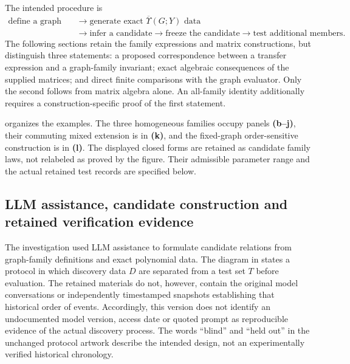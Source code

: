 \documentclass[10pt,twocolumn]{article}
\begin{document}
The intended procedure is
\begin{equation}
\boxed{\begin{aligned}
\text{define a graph family}&\longrightarrow\text{generate exact }\overline{\Upsilon}(G;Y)\text{ data}\\
&\longrightarrow\text{infer a candidate}\longrightarrow\text{freeze the candidate}\longrightarrow\text{test additional members}.
\end{aligned}}
\label{suppeq:yamada_discovery_direction}
\end{equation}
The following sections retain the family expressions and matrix constructions, but distinguish three statements: a proposed correspondence between a transfer expression and a graph-family invariant; exact algebraic consequences of the supplied matrices; and direct finite comparisons with the graph evaluator. Only the second follows from matrix algebra alone. An all-family identity additionally requires a construction-specific proof of the first statement.

 organizes the examples. The three homogeneous families occupy panels \textbf{(b--j)}, their commuting mixed extension is in \textbf{(k)}, and the fixed-graph order-sensitive construction is in \textbf{(l)}. The displayed closed forms are retained as candidate family laws, not relabeled as proved by the figure. Their admissible parameter range and the actual retained test records are specified below.

\subsection{LLM assistance, candidate construction and retained verification evidence}
\label{supp:llm_discovery_protocol}
The investigation used LLM assistance to formulate candidate relations from graph-family definitions and exact polynomial data. The diagram in  states a protocol in which discovery data $D$ are separated from a test set $T$ before evaluation. The retained materials do not, however, contain the original model conversations or independently timestamped snapshots establishing that historical order of events. Accordingly, this version does not identify an undocumented model version, access date or quoted prompt as reproducible evidence of the actual discovery process. The words ``blind'' and ``held out'' in the unchanged protocol artwork describe the intended design, not an experimentally verified historical chronology.
\end{document}
